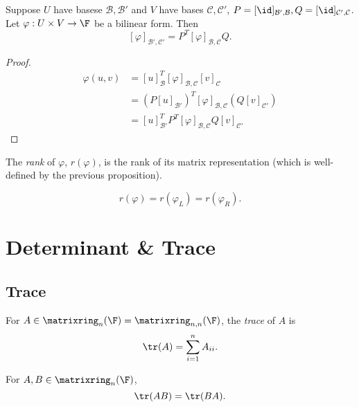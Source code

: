 \documentclass[a4paper]{article}
\newcommand*{\M}{\matrixring}
\newcommand*{\basis}{\mathcal}
\theoremstyle{definition}
\begin{document}
\begin{proposition}
  \label{prop:change of basis of bilinear form}
  Suppose \(U\) have basese \(\basis B, \basis B'\) and \(V \) have bases \(\basis C, \basis C'\), \(P = [\id]_{\basis B', \basis B}, Q = [\id]_{\basis C',\basis C}\). Let \(\varphi: U \times V \to \F\) be a bilinear form. Then
  \[
    [\varphi]_{\basis B',\basis C'} = P^T[\varphi]_{\basis B,\basis C}Q.
  \]
\end{proposition}

\begin{proof}
  \begin{align*}
    \varphi(u, v) &= [u]_{\basis B}^T [\varphi]_{\basis B, \basis C} [v]_{\basis C} \\
                  &= (P[u]_{\basis B'})^T [\varphi]_{\basis B, \basis C} (Q[v]_{\basis C'}) \\
                  &= [u]_{\basis B'}^T P^T[\varphi]_{\basis B, \basis C}Q[v]_{\basis C'} 
  \end{align*}
\end{proof}

\begin{definition}
  The \emph{rank} of \(\varphi\), \(r(\varphi)\), is the rank of its matrix representation (which is well-defined by the previous proposition).
\end{definition}

\begin{note}
  \[
    r(\varphi) = r(\varphi_L) = r(\varphi_R).
  \]
\end{note}

\section{Determinant \& Trace}


\subsection{Trace}

\begin{definition}[Trace]
  For \(A \in \M_n(\F) = \M_{n,n}(\F)\), the \emph{trace} of \(A\) is
  \[
    \tr(A) = \sum_{i=1}^{n}A_{ii}.
  \]
\end{definition}

\begin{lemma}
  For \(A, B\in \M_n(\F)\),
  \[
    \tr(AB) = \tr(BA).
  \]
\end{lemma}
\end{document}
